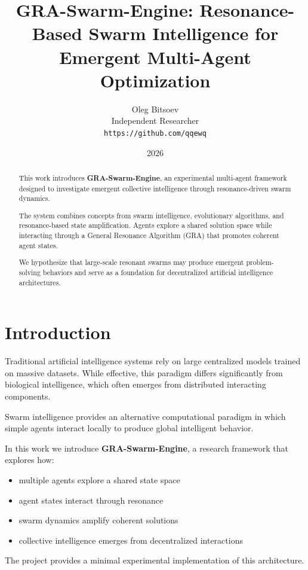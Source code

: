 \documentclass[11pt]{article}
\title{GRA-Swarm-Engine: Resonance-Based Swarm Intelligence for Emergent Multi-Agent Optimization}
\author{
Oleg Bitsoev\\ 
Independent Researcher \\
\texttt{https://github.com/qqewq}
}
\date{2026}
\begin{document}
\maketitle

\begin{abstract}

This work introduces \textbf{GRA-Swarm-Engine}, an experimental multi-agent framework designed to investigate emergent collective intelligence through resonance-driven swarm dynamics.

The system combines concepts from swarm intelligence, evolutionary algorithms, and resonance-based state amplification. Agents explore a shared solution space while interacting through a General Resonance Algorithm (GRA) that promotes coherent agent states.

We hypothesize that large-scale resonant swarms may produce emergent problem-solving behaviors and serve as a foundation for decentralized artificial intelligence architectures.

\end{abstract}

\section{Introduction}

Traditional artificial intelligence systems rely on large centralized models trained on massive datasets. While effective, this paradigm differs significantly from biological intelligence, which often emerges from distributed interacting components.

Swarm intelligence provides an alternative computational paradigm in which simple agents interact locally to produce global intelligent behavior.

In this work we introduce \textbf{GRA-Swarm-Engine}, a research framework that explores how:

\begin{itemize}
\item multiple agents explore a shared state space
\item agent states interact through resonance
\item swarm dynamics amplify coherent solutions
\item collective intelligence emerges from decentralized interactions
\end{itemize}

The project provides a minimal experimental implementation of this architecture.
\end{document}

